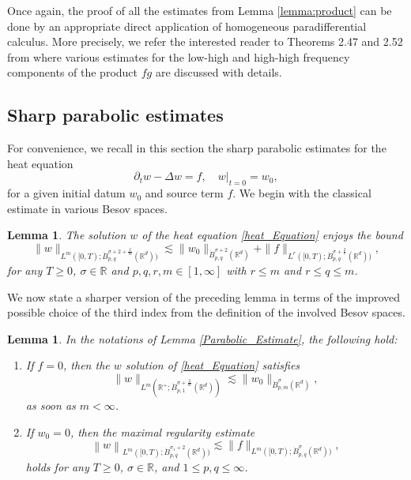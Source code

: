 \documentclass[11pt, leqno, a4paper,]{amsart}
\newcommand{\R}{\mathbb{R}}
\newtheorem{lemma}[theorem]{Lemma}
\theoremstyle{remark}
\numberwithin{equation}{section}
\begin{document}
 Once again, the proof of all the estimates from Lemma \ref{lemma:product} can be done by an appropriate direct application of homogeneous paradifferential calculus. More precisely, we refer the interested reader to Theorems 2.47 and 2.52 from \cite{bcd11} where various estimates for the low-high  and high-high frequency components of the product $fg$ are discussed with details.
 
 \subsection{Sharp parabolic estimates}
 
For convenience, we recall in this section the sharp parabolic  estimates for the heat equation
\begin{equation}\label{heat_Equation}
\partial_t w - \Delta w = f, \quad w|_{t=0} = w_0,
\end{equation}
for a given initial datum $w_0$ and source term $f$.   We begin with the classical estimate in various Besov spaces. 
\begin{lemma}\cite{ag20}\label{Lemma_parabolic_Regularity}
The solution  $w$ of the heat equation \eqref{heat_Equation} enjoys the bound
\begin{equation}\label{Parabolic_Estimate}
\|w\|_{L^m([0,T); \dot{B}^{\sigma+2+\frac{2}{m}}_{p,q}(\mathbb R^d))} \lesssim  \|w_0\|_{\dot{B}^{\sigma+2}_{p,q}(\mathbb R^d)} + \|f\|_{L^r([0,T); \dot{B}^{\sigma+\frac{2}{r}}_{p,q} (\mathbb R^d))}, 
\end{equation}
for any $T\geq 0$, $\sigma\in \R$ and $p,q, r, m\in [1,\infty]$ with  $r\leq  m $ and   $r\leq q \leq m$.  
\end{lemma}

We now state a sharper version of the preceding lemma in terms of the improved possible choice of the third index from the definition of the involved Besov spaces. 
\begin{lemma}\cite[Proposition 2.2 and Proposition 2.5]{ah}\label{Lemma_parab_2}
In the notations of Lemma \ref{Parabolic_Estimate}, the following hold:
\begin{enumerate}
\item If $f=0$, then the $w$ solution of \eqref{heat_Equation} satisfies 
\begin{equation*} 
\|w\|_{L^m(\mathbb {R}^+; \dot{B}^{\sigma+\frac{2}{m}}_{p,1}(\mathbb R^d))} \lesssim  \|w_0\|_{\dot{B}^{\sigma}_{p,m}(\mathbb R^d)} ,
\end{equation*}
as soon as  $m<\infty$.
\item If $w_0=0$, then the maximal regularity estimate  
\begin{equation*} 
\left\|  w \right\|_{L^m([0,T); \dot{B}^{\sigma_1+2}_{p,q}(\mathbb R^d))}
\lesssim  \|f\|_{L^m([0,T); \dot{B}^{\sigma}_{p,q}(\mathbb R^d))},
\end{equation*} 
holds for any $T\geq 0$, $\sigma\in \mathbb R$,  and  $1 \leq p, q \leq \infty$.
\end{enumerate}

\end{lemma}
\end{document}

